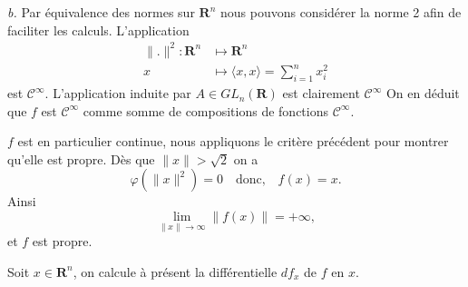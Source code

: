 \documentclass[12pt]{article}
\newcommand{\R}{\mathbf{R}}
\begin{document}
\medskip

\textit{b.} Par équivalence des normes sur $\R^{n}$ nous pouvons considérer la norme 2 afin de faciliter les calculs. L'application
\begin{align*}
        \|.\|^{2} : \R^{n} &\longmapsto \R^{n} \\
        x &\longmapsto \langle x, x \rangle = \sum_{i=1}^{n}x_{i}^{2}
\end{align*} est $\mathcal{C}^{\infty}$. L'application induite par $A \in GL_{n}(\R)$ est clairement $\mathcal{C}^{\infty}$ On en déduit que $f$ est $\mathcal{C}^{\infty}$ comme somme de compositions de fonctions $\mathcal{C}^{\infty}$.


$f$ est en particulier continue, nous appliquons le critère précédent pour montrer qu'elle est propre. Dès que $\|x\| > \sqrt{2}$ on a \[
        \varphi(\|x\|^{2}) = 0 \quad \text{donc,} \quad f(x) = x
.\] Ainsi \[
\lim_{\|x\|\to \infty}\|f(x)\| = +\infty
,\] et $f$ est propre. 

Soit $x \in \R^{n}$, on calcule à présent la différentielle $df_{x}$ de $f$ en $x$.
\end{document}
